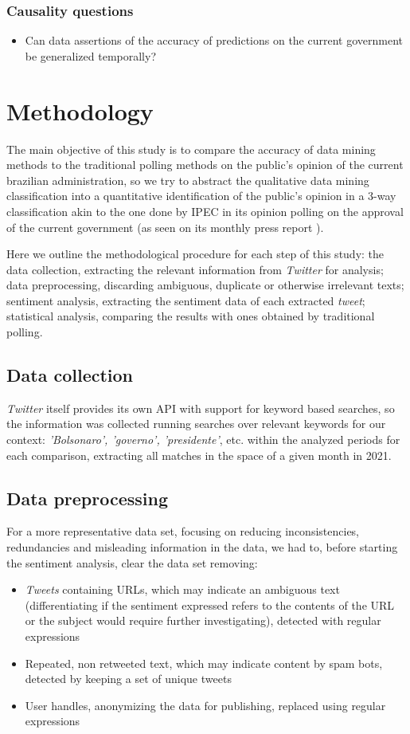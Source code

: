 \documentclass[conference]{IEEEtran}
\begin{document}
\subsubsection{Causality questions}
\label{sec:org4c02e5f}
\begin{itemize}
\item Can data assertions of the accuracy of predictions on the current government be generalized temporally?
\end{itemize}
\section{Methodology}
\label{sec:org8e900d8}
The main objective of this study is to compare the accuracy of data mining methods to the traditional polling methods on the public's opinion of the current brazilian administration, so we try to abstract the qualitative data mining classification into a quantitative identification of the public's opinion in a 3-way classification akin to the one done by IPEC in its opinion polling on the approval of the current government (as seen on its monthly press report \cite{IpecSetembro}).

Here we outline the methodological procedure for each step of this study: the data collection, extracting the relevant information from \emph{Twitter} for analysis; data preprocessing, discarding ambiguous, duplicate or otherwise irrelevant texts; sentiment analysis, extracting the sentiment data of each extracted \emph{tweet}; statistical analysis, comparing the results with ones obtained by traditional polling.
\subsection{Data collection}
\label{sec:org46763a3}
\emph{Twitter} itself provides its own API with support for keyword based searches, so the information was collected running searches over relevant keywords for our context: \emph{'Bolsonaro', 'governo', 'presidente'}, etc. within the analyzed periods for each comparison, extracting all matches in the space of a given month in 2021.
\subsection{Data preprocessing}
\label{sec:org8873fc0}
For a more representative data set, focusing on reducing inconsistencies, redundancies and misleading information in the data, we had to, before starting the sentiment analysis, clear the data set removing:
\begin{itemize}
\item \emph{Tweets} containing URLs, which may indicate an ambiguous text (differentiating if the sentiment expressed refers to the contents of the URL or the subject would require further investigating), detected with regular expressions
\item Repeated, non retweeted text, which may indicate content by spam bots, detected by keeping a set of unique tweets
\item User handles, anonymizing the data for publishing, replaced using regular expressions
\end{itemize}
\end{document}
